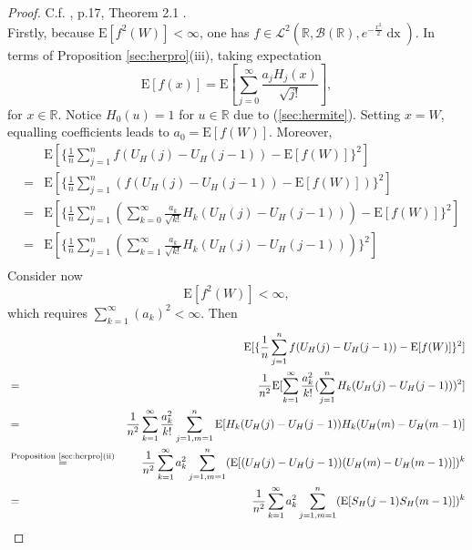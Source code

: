 \documentclass[a4paper, twoside, 11pt]{article}
\theoremstyle{definition}
\begin{document}
\begin{proof}
  C.f. \cite{nourdin}, p.17, Theorem 2.1 .\\
  Firstly, because $\mathrm{E}[f^2(W)] < \infty$, one has $f \in \mathcal{L}^2(\mathbb{R}, \mathscr{B}(\mathbb{R}), e^{-\frac{x^2}{2}}\mathop{dx})$. In terms of Proposition \ref{sec:herpro}(iii), taking expectation
 \begin{equation*}
	\mathrm{E}[f(x)] = \mathrm{E}[\sum\limits_{j=0}^{\infty} \frac{a_jH_j(x)}{\sqrt{j!}}], 
  \end{equation*}
  for $x \in \mathbb{R}$.
  Notice $H_0(u)=1$ for $u\in \mathbb{R}$ due to (\ref{sec:hermite}). Setting $x=W$, equalling coefficients leads to $a_0 = \mathrm{E}[f(W)]$. Moreover,
  \begin{eqnarray*}
	&& \mathrm{E}[\{\frac{1}{n}\sum\limits_{j=1}^n f(U_H(j) - U_H(j-1)) - \mathrm{E}[f(W)]\}^2]\\
	&=& \mathrm{E}[\{\frac{1}{n}\sum\limits_{j=1}^n (f(U_H(j) - U_H(j-1)) - \mathrm{E}[f(W)])\}^2] \\
	&=& \mathrm{E}[\{\frac{1}{n}\sum\limits_{j=1}^n (\sum\limits_{k=0}^\infty \frac{a_k}{\sqrt{k!}} H_k(U_H(j) - U_H(j-1))) - \mathrm{E}[f(W)]\}^2] \\
	&=& \mathrm{E}[\{\frac{1}{n}\sum\limits_{j=1}^n (\sum\limits_{k=1}^\infty \frac{a_k}{\sqrt{k!}} H_k(U_H(j) - U_H(j-1)))\}^2] \\
  \end{eqnarray*}
  Consider now 
  \begin{equation*}
	\mathrm{E}[f^2(W)] < \infty,
  \end{equation*}
  which requires $\sum\limits_{k=1}^\infty (a_k)^2 < \infty$. Then
  \begin{eqnarray*}
	&& \mathrm{E}[\{\frac{1}{n}\sum\limits_{j=1}^n f(U_H(j) - U_H(j-1)) - \mathrm{E}[f(W)]\}^2]\\
	&=& \frac{1}{n^2} \mathrm{E}[\sum\limits_{k=1}^\infty \frac{a_k^2}{k!}(\sum\limits_{j=1}^n H_k(U_H(j) - U_H(j-1)))^2] \\
	&=& \frac{1}{n^2} \sum\limits_{k=1}^\infty \frac{a_k^2}{k!}\sum\limits_{j=1, m=1}^n \mathrm{E}[H_k(U_H(j) - U_H(j-1))  H_k(U_H(m) - U_H(m-1)]\\
	&\overset{\text{Proposition \ref{sec:herpro}(ii)}}{=}&  \frac{1}{n^2} \sum\limits_{k=1}^\infty a_k^2\sum\limits_{j=1, m=1}^n (\mathrm{E}[(U_H(j) - U_H(j-1)) (U_H(m) - U_H(m-1))])^k \\
	&=& \frac{1}{n^2} \sum\limits_{k=1}^\infty a_k^2\sum\limits_{j=1, m=1}^n (\mathrm{E}[S_H(j-1) S_H(m-1)])^k\\

\end{eqnarray*}
\end{proof}
\end{document}
